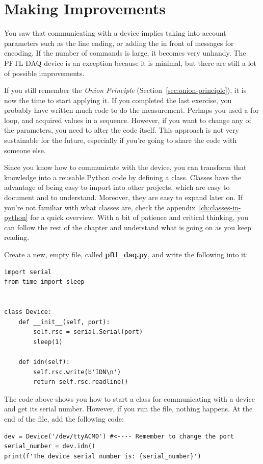 \section{Making Improvements}\label{sec:going-higher-level}
You saw that communicating with a device implies taking into account parameters such as the line ending, or adding the  in front of messages for encoding. If the number of commands is large, it becomes very unhandy. The {PFTL DAQ} device is an exception because it is minimal, but there are still a lot of possible improvements.

If you still remember the \emph{Onion Principle} (Section~\ref{sec:onion-principle}), it is now the time to start applying it. If you completed the last exercise, you probably have written much code to do the measurement. Perhaps you used a for loop, and acquired values in a sequence. However, if you want to change any of the parameters, you need to alter the code itself. This approach is not very sustainable for the future, especially if you're going to share the code with someone else.

Since you know how to communicate with the device, you can transform that knowledge into a reusable Python code by defining a class. Classes have the advantage of being easy to import into other projects, which are easy to document and to understand. Moreover, they are easy to expand later on. If you're not familiar with what classes are, check the appendix~\ref{ch:classes-in-python} for a quick overview. With a bit of patience and critical thinking, you can follow the rest of the chapter and understand what is going on as you keep reading.

Create a new, empty file, called \textbf{pftl\_daq.py}, and write the following into it:

\begin{verbatim}
import serial
from time import sleep


class Device:
    def __init__(self, port):
        self.rsc = serial.Serial(port)
        sleep(1)

    def idn(self):
        self.rsc.write(b'IDN\n')
        return self.rsc.readline()

\end{verbatim}

The code above shows you how to start a class for communicating with a device and get its serial number. However, if you run the file, nothing happens. At the end of the file, add the following code:

\begin{verbatim}
dev = Device('/dev/ttyACM0') #<---- Remember to change the port
serial_number = dev.idn()
print(f'The device serial number is: {serial_number}')
\end{verbatim}

